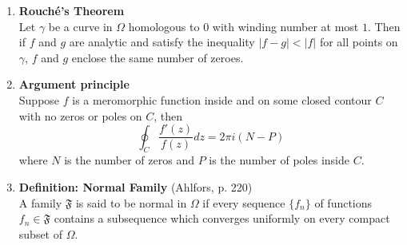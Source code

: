 \documentclass{article}
\begin{document}
\begin{enumerate}
  \item \textbf{Rouch\'e's Theorem}\\
    Let $\gamma$ be a curve in $\Omega$ homologous to $0$ with winding number
    at most $1$. Then if $f$ and $g$ are analytic and satisfy the inequality
    $|f - g| < |f|$ for all points on $\gamma$, $f$ and $g$ enclose the same
    number of zeroes.

  \item \textbf{Argument principle}\\
    Suppose $f$ is a meromorphic function inside and on some closed contour $C$
    with no zeros or poles on $C$, then \[
      \oint_C\frac{f'(z)}{f(z)}dz = 2\pi i(N - P)
    \] where $N$ is the number of zeros and $P$ is the number of poles inside
    $C$.

  \item \textbf{Definition: Normal Family} (Ahlfors, p. 220)\\
    A family $\mathfrak F$ is said to be normal in $\Omega$ if every sequence
    $\{f_n\}$ of functions $f_n \in \mathfrak F$ contains a subsequence which
    converges uniformly on every compact subset of $\Omega$.
\end{enumerate}
\end{document}
